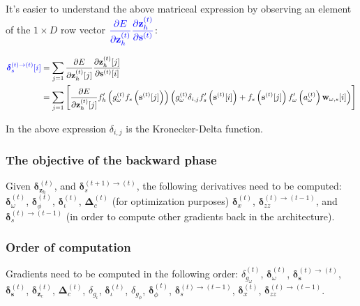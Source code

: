 \documentclass[11pt]{article}
\begin{document}
It's easier to understand the above matriceal expression by observing
an element of the $1 \times D$ row vector ${\color{blue}
      \dfrac{\partial E}{\partial \mathbf{z}_h^{(t)}}
      \dfrac{\partial \mathbf{z}_h^{(t)}}{\partial
        \mathbf{s}^{(t)}}}$:

\begin{equation}
  \begin{split}
    {\color{blue}\boldsymbol{\delta}_s^{(t)\rightarrow(t)}[i]} & =
    \displaystyle\sum_{j=1}
    \dfrac{\partial E}{\partial \mathbf{z}_h^{(t)}[j]}
    \dfrac{\partial \mathbf{z}_h^{(t)}[j]}{\partial
      \mathbf{s}^{(t)}[i]}
      \\ & = \displaystyle\sum_{j=1}\left[
      \dfrac{\partial E}{\partial \mathbf{z}_h^{(t)}[j]}
      f_{h}'\left(g_{\omega}^{(t)}f_s\left(\mathbf{s}^{(t)}[j]\right)\right)
      \left( g^{(t)}_{\omega} \delta_{i,j} f_s'\left(\mathbf{s}^{(t)}[i]\right) +
        f_s\left(\mathbf{s}^{(t)}[j]\right)f'_{\omega}\left(a_{\omega}^{(t)}\right)\mathbf{w}_{\omega,s}[i] \right)\right]
  \end{split}
\end{equation}

In the above expression $\delta_{i,j}$ is the Kronecker-Delta function.

\subsubsection*{The objective of the backward phase}

Given $\boldsymbol{\delta}_{\mathbf{z}_h}^{(t)}$, and
$\boldsymbol{\delta}^{(t+1) \rightarrow (t)}_s$, the following
derivatives need to be computed: $\boldsymbol{\delta}_{\omega}^{(t)}$,
$\boldsymbol{\delta}_{\phi}^{(t)}$,
$\boldsymbol{\delta}_{\iota}^{(t)}$, $\boldsymbol{\Delta}_{c}^{(t)}$
(for optimization purposes) $\boldsymbol{\delta}_x^{(t)}$,
$\boldsymbol{\delta}_{zz}^{(t)\rightarrow(t-1)}$, and
$\boldsymbol{\delta}^{(t) \rightarrow (t-1)}_s$ (in order to compute
other gradients back in the architecture).

\subsubsection*{Order of computation}
Gradients need to be computed in the following order:
$\delta_{g_{\omega}}^{(t)}$, $\boldsymbol{\delta}_{\omega}^{(t)}$,
$\boldsymbol{\delta}_\mathbf{s}^{(t) \rightarrow (t)}$, $\boldsymbol{\delta}_{\mathbf{s}}^{(t)}$, $\boldsymbol{\delta}_{\mathbf{z}_c}^{(t)}$,
$\boldsymbol{\Delta}_{c}^{(t)}$, $\delta_{g_{\iota}}$,
$\boldsymbol{\delta}_{\iota}^{(t)}$, $\delta_{g_{\phi}}$,
$\boldsymbol{\delta}_{\phi}^{(t)}$,
$\boldsymbol{\delta}_s^{(t) \rightarrow (t-1)}$, $\boldsymbol{\delta}_x^{(t)}$,
$\boldsymbol{\delta}_{zz}^{(t)\rightarrow(t-1)}$.
\end{document}
